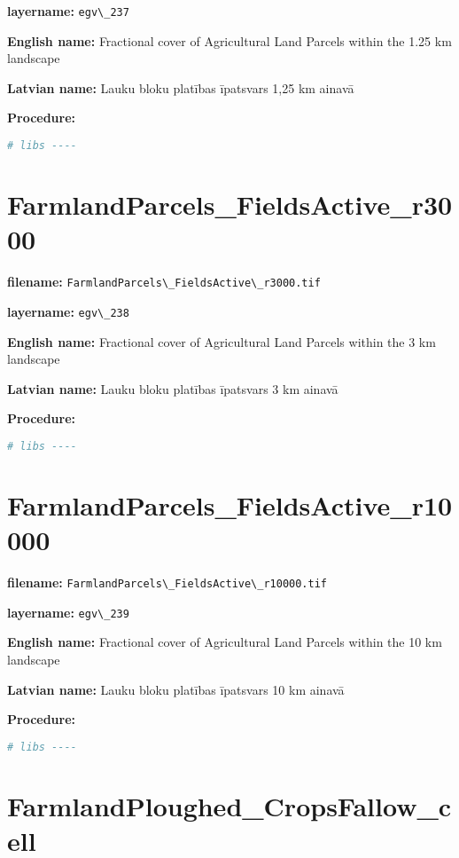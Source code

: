 \documentclass[
]{book}
\newcommand{\passthrough}[1]{#1}
\begin{document}
\textbf{layername:} \passthrough{\lstinline!egv\_237!}

\textbf{English name:} Fractional cover of Agricultural Land Parcels within the 1.25 km landscape

\textbf{Latvian name:} Lauku bloku platības īpatsvars 1,25 km ainavā

\textbf{Procedure:}

\begin{lstlisting}[language=R]
# libs ----
\end{lstlisting}

\section{FarmlandParcels\_FieldsActive\_r3000}\label{ch06.238}

\textbf{filename:} \passthrough{\lstinline!FarmlandParcels\_FieldsActive\_r3000.tif!}

\textbf{layername:} \passthrough{\lstinline!egv\_238!}

\textbf{English name:} Fractional cover of Agricultural Land Parcels within the 3 km landscape

\textbf{Latvian name:} Lauku bloku platības īpatsvars 3 km ainavā

\textbf{Procedure:}

\begin{lstlisting}[language=R]
# libs ----
\end{lstlisting}

\section{FarmlandParcels\_FieldsActive\_r10000}\label{ch06.239}

\textbf{filename:} \passthrough{\lstinline!FarmlandParcels\_FieldsActive\_r10000.tif!}

\textbf{layername:} \passthrough{\lstinline!egv\_239!}

\textbf{English name:} Fractional cover of Agricultural Land Parcels within the 10 km landscape

\textbf{Latvian name:} Lauku bloku platības īpatsvars 10 km ainavā

\textbf{Procedure:}

\begin{lstlisting}[language=R]
# libs ----
\end{lstlisting}

\section{FarmlandPloughed\_CropsFallow\_cell}\label{ch06.240}
\end{document}
